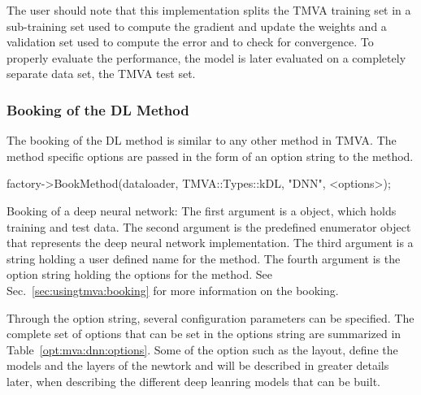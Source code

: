 The user should note that this implementation splits the TMVA training set in a sub-training set used to compute the gradient and update the weights and a validation set used to compute  the error and
to check for convergence. To properly evaluate the performance, the 
model is later  evaluated on a completely separate data set, the TMVA test set.

\subsubsection{Booking of the DL Method}

The booking of the DL method is similar to any other method in TMVA. The method
specific options are passed in the form of an option string  to
the method.

\begin{codeexample}
\begin{tmvacode}
factory->BookMethod(dataloader, TMVA::Types::kDL, "DNN", <options>);
\end{tmvacode}
\caption[.]{\codeexampleCaptionSize Booking of a deep neural network:
 The first argument is a  object, which holds training and test
 data. The second argument is the predefined enumerator object that represents
 the deep neural network implementation. The third argument is a string holding
 a user defined name for the method. The fourth argument is the option string
 holding the options for the method. See Sec.~\ref{sec:usingtmva:booking}
 for more information on the booking.}
\label{example:DNN_booking}
\end{codeexample}

Through the option string, several configuration parameters can be specified.
The complete set of options that can be set in the options string are summarized in
Table~\ref{opt:mva:dnn:options}.
Some of the option such as the layout, define the models and the layers of the newtork and will be
described in greater details later, when describing the different deep leanring models that can be built.

